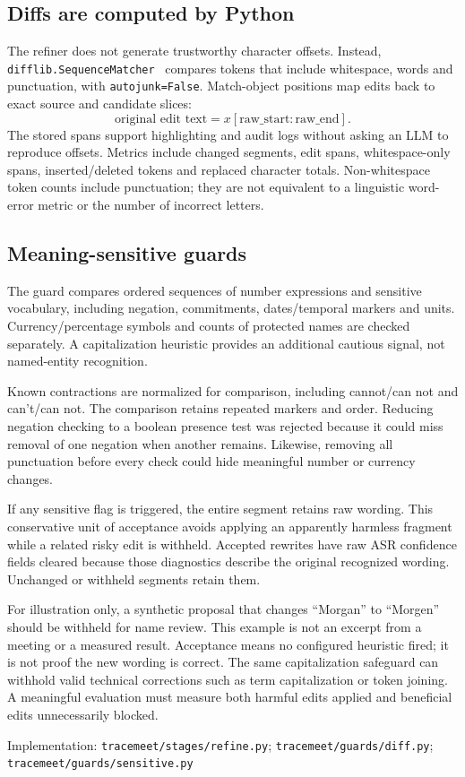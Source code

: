 \documentclass[11pt,a4paper]{article}
\newcommand{\code}[1]{\nolinkurl{#1}}
\newcommand{\src}[1]{\par{\footnotesize\raggedright\textcolor{accent}{Implementation:} #1\par}}
\begin{document}
\subsection{Diffs are computed by Python}
The refiner does not generate trustworthy character offsets. Instead, \code{difflib.SequenceMatcher}~\cite{difflib} compares tokens that include whitespace, words and punctuation, with \code{autojunk=False}. Match-object positions map edits back to exact source and candidate slices:
\[
\text{original edit text}=x[\text{raw\_start}:\text{raw\_end}].
\]
The stored spans support highlighting and audit logs without asking an LLM to reproduce offsets. Metrics include changed segments, edit spans, whitespace-only spans, inserted/deleted tokens and replaced character totals. Non-whitespace token counts include punctuation; they are not equivalent to a linguistic word-error metric or the number of incorrect letters.

\subsection{Meaning-sensitive guards}
The guard compares ordered sequences of number expressions and sensitive vocabulary, including negation, commitments, dates/temporal markers and units. Currency/percentage symbols and counts of protected names are checked separately. A capitalization heuristic provides an additional cautious signal, not named-entity recognition.

Known contractions are normalized for comparison, including cannot/can not and can't/can not. The comparison retains repeated markers and order. Reducing negation checking to a boolean presence test was rejected because it could miss removal of one negation when another remains. Likewise, removing all punctuation before every check could hide meaningful number or currency changes.

If any sensitive flag is triggered, the entire segment retains raw wording. This conservative unit of acceptance avoids applying an apparently harmless fragment while a related risky edit is withheld. Accepted rewrites have raw ASR confidence fields cleared because those diagnostics describe the original recognized wording. Unchanged or withheld segments retain them.

For illustration only, a synthetic proposal that changes ``Morgan'' to ``Morgen'' should be withheld for name review. This example is not an excerpt from a meeting or a measured result. Acceptance means no configured heuristic fired; it is not proof the new wording is correct. The same capitalization safeguard can withhold valid technical corrections such as term capitalization or token joining. A meaningful evaluation must measure both harmful edits applied and beneficial edits unnecessarily blocked.
\src{\code{tracemeet/stages/refine.py}; \code{tracemeet/guards/diff.py}; \code{tracemeet/guards/sensitive.py}}
\end{document}
